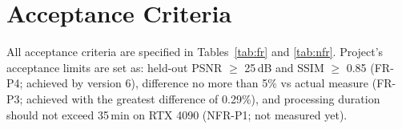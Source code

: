 \section{Acceptance Criteria}
\label{sec:acceptance}
All acceptance criteria are specified in Tables~\ref{tab:fr} and \ref{tab:nfr}. Project's acceptance limits are set as: held-out PSNR $\geq$ 25\,dB and SSIM $\geq$ 0.85 (FR-P4; achieved by version 6), difference no more than 5\% vs actual measure (FR-P3; achieved with the greatest difference of 0.29\%), and processing duration should not exceed 35\,min on RTX 4090 (NFR-P1; not measured yet).
